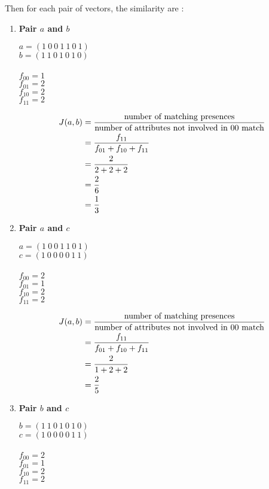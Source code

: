 \documentclass[12pt]{article}%
\begin{document}
\begin{enumerate}
\begin{enumerate}
		\par Then for each pair of vectors, the similarity are :
		\begin{enumerate}
			\item \textbf{Pair $a$ and $b$}
			\par $a = (1 \ 0 \ 0 \ 1 \ 1 \ 0 \ 1)$ \\ $b = (1 \ 1 \ 0 \ 1 \ 0 \ 1 \ 0)$ \\
			\\ $f_{00} = 1$
			\\ $f_{01} = 2$
			\\ $f_{10} = 2$
			\\ $f_{11} = 2$
			

			\begin{align*}
				J(a,b) & = \frac{\textup{number of matching presences}}{\textup{number of attributes not involved in 00 match}} \\
				& = \frac{f_{11}}{f_{01}+f_{10}+f_{11}} \\
				& = \frac{2}{2+2+2} \\
				& = \frac{2}{6} \\
				& = \frac{1}{3}
			\end{align*}
			
			\item \textbf{Pair $a$ and $c$}
			\par $a = (1 \ 0 \ 0 \ 1 \ 1 \ 0 \ 1)$ \\ $c = (1 \ 0 \ 0 \ 0 \ 0 \ 1 \ 1)$ \\
			\\ $f_{00} = 2$
			\\ $f_{01} = 1$
			\\ $f_{10} = 2$
			\\ $f_{11} = 2$


			\begin{align*}
				J(a,b) & = \frac{\textup{number of matching presences}}{\textup{number of attributes not involved in 00 match}} \\
				& = \frac{f_{11}}{f_{01}+f_{10}+f_{11}} \\
				& = \frac{2}{1+2+2} \\
				& = \frac{2}{5} \\
			\end{align*}

			\item \textbf{Pair $b$ and $c$}
			\par $b = (1 \ 1 \ 0 \ 1 \ 0 \ 1 \ 0)$ \\ $c = (1 \ 0 \ 0 \ 0 \ 0 \ 1 \ 1)$ \\
			\\ $f_{00} = 2$
			\\ $f_{01} = 1$
			\\ $f_{10} = 2$
			\\ $f_{11} = 2$



\end{enumerate}
\end{enumerate}
\end{enumerate}
\end{document}
